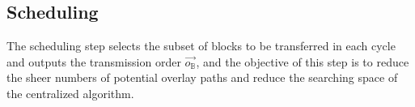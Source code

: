 

\subsection{Scheduling}
\label{subsec:logic:scheduling}

The scheduling step
selects the subset of blocks to be transferred in each cycle and
outputs the transmission order $\overrightarrow{o_\mathbb{B}}$, and the objective of this step is to reduce the sheer numbers of potential overlay paths and reduce the searching space of the centralized algorithm.

